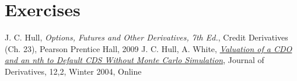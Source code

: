 \section*{Exercises}


\begin{thebibliography}{9}
 J. C. Hull, \emph{Options, Futures and Other Derivatives, 7th Ed.}, Credit Derivatives (Ch. 23), Pearson Prentice Hall, 2009
 J. C. Hull, A. White, \href{http://www-2.rotman.utoronto.ca/~hull/downloadablepublications/HullWhiteCDOPaper.pdf}{\emph{Valuation of a CDO and an nth to Default CDS Without Monte Carlo Simulation}}, Journal of Derivatives, 12,2, Winter 2004,  Online 
\end{thebibliography}
